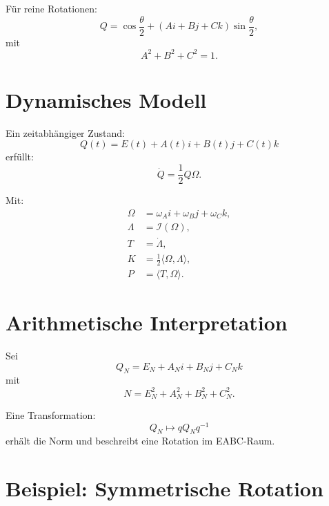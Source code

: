 \documentclass[11pt]{article}
\begin{document}
	Für reine Rotationen:
	\begin{equation}
		Q =
		\cos\frac{\theta}{2}
		+
		(Ai + Bj + Ck)\sin\frac{\theta}{2},
	\end{equation}
	mit
	\begin{equation}
		A^2 + B^2 + C^2 = 1.
	\end{equation}
	
	\section{Dynamisches Modell}
	
	Ein zeitabhängiger Zustand:
	\begin{equation}
		Q(t) = E(t) + A(t)i + B(t)j + C(t)k
	\end{equation}
	erfüllt:
	\begin{equation}
		\dot Q = \frac12 Q \Omega.
	\end{equation}
	
	Mit:
	\begin{align}
		\Omega &= \omega_A i + \omega_B j + \omega_C k,\\
		\Lambda &= \mathcal I(\Omega),\\
		T &= \dot\Lambda,\\
		K &= \frac12 \langle \Omega,\Lambda\rangle,\\
		P &= \langle T,\Omega\rangle.
	\end{align}
	
	\section{Arithmetische Interpretation}
	
	Sei
	\begin{equation}
		Q_N = E_N + A_N i + B_N j + C_N k
	\end{equation}
	mit
	\begin{equation}
		N = E_N^2 + A_N^2 + B_N^2 + C_N^2.
	\end{equation}
	
	Eine Transformation:
	\begin{equation}
		Q_N \mapsto q Q_N q^{-1}
	\end{equation}
	erhält die Norm und beschreibt eine Rotation im EABC-Raum.
	
	\section{Beispiel: Symmetrische Rotation}
	
\end{document}
